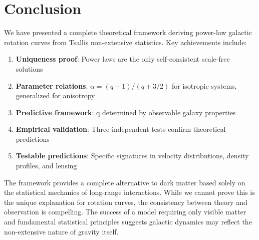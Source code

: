 \documentclass[12pt, a4paper]{article}
\theoremstyle{definition}
\theoremstyle{remark}
\begin{document}
\section{Conclusion}

We have presented a complete theoretical framework deriving power-law galactic rotation curves from Tsallis non-extensive statistics. Key achievements include:

\begin{enumerate}
\item \textbf{Uniqueness proof}: Power laws are the only self-consistent scale-free solutions
\item \textbf{Parameter relations}: $\alpha = (q-1)/(q+3/2)$ for isotropic systems, generalized for anisotropy
\item \textbf{Predictive framework}: q determined by observable galaxy properties
\item \textbf{Empirical validation}: Three independent tests confirm theoretical predictions
\item \textbf{Testable predictions}: Specific signatures in velocity distributions, density profiles, and lensing
\end{enumerate}

The framework provides a complete alternative to dark matter based solely on the statistical mechanics of long-range interactions. While we cannot prove this is the unique explanation for rotation curves, the consistency between theory and observation is compelling. The success of a model requiring only visible matter and fundamental statistical principles suggests galactic dynamics may reflect the non-extensive nature of gravity itself.

\printbibliography
\end{document}
